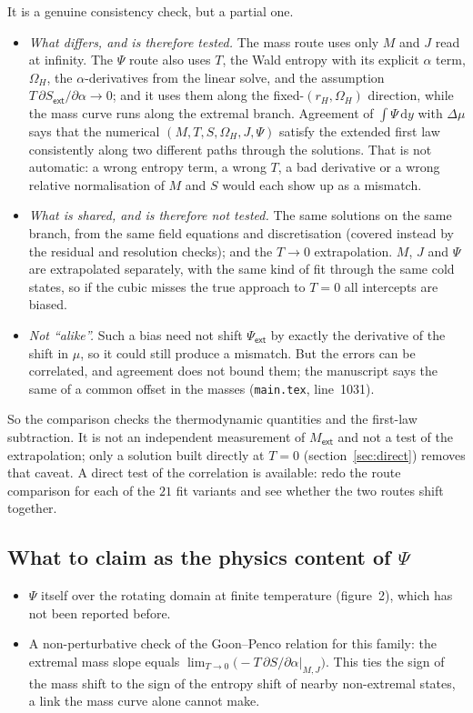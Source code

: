 \documentclass[11pt,a4paper]{article}
\newcommand{\q}[1]{\subsection*{\color{accent}#1}}
\newcommand{\ext}{\mathsf{ext}}
\begin{document}
It is a genuine consistency check, but a partial one.
\begin{itemize}\itemsep3pt
  \item \emph{What differs, and is therefore tested.} The mass route uses only
  $M$ and $J$ read at infinity. The $\Psi$ route also uses $T$, the Wald entropy
  with its explicit $\alpha$ term, $\Omega_H$, the $\alpha$-derivatives from the
  linear solve, and the assumption $T\,\partial S_\ext/\partial\alpha\to0$; and
  it uses them along the fixed-$(r_H,\Omega_H)$ direction, while the mass curve
  runs along the extremal branch. Agreement of $\int\Psi\,\mathrm dy$ with
  $\Delta\mu$ says that the numerical $(M,T,S,\Omega_H,J,\Psi)$ satisfy the
  extended first law consistently along two different paths through the
  solutions. That is not automatic: a wrong entropy term, a wrong $T$, a bad
  derivative or a wrong relative normalisation of $M$ and $S$ would each show
  up as a mismatch.
  \item \emph{What is shared, and is therefore not tested.} The same solutions
  on the same branch, from the same field equations and discretisation
  (covered instead by the residual and resolution checks); and the $T\to0$
  extrapolation. $M$, $J$ and $\Psi$ are extrapolated separately, with the same
  kind of fit through the same cold states, so if the cubic misses the true
  approach to $T=0$ all intercepts are biased.
  \item \emph{Not ``alike''.} Such a bias need not shift $\Psi_\ext$ by exactly
  the derivative of the shift in $\mu$, so it could still produce a mismatch.
  But the errors can be correlated, and agreement does not bound them; the
  manuscript says the same of a common offset in the masses
  (\texttt{main.tex}, line~1031).
\end{itemize}
So the comparison checks the thermodynamic quantities and the first-law
subtraction. It is not an independent measurement of $M_\ext$ and not a test of
the extrapolation; only a solution built directly at $T=0$
(section~\ref{sec:direct}) removes that caveat. A direct test of the
correlation is available: redo the route comparison for each of the $21$ fit
variants and see whether the two routes shift together.

\q{What to claim as the physics content of $\Psi$}

\begin{itemize}\itemsep3pt
  \item $\Psi$ itself over the rotating domain at finite temperature
  (figure~2), which has not been reported before.
  \item A non-perturbative check of the Goon--Penco relation for this family:
  the extremal mass slope equals $\lim_{T\to0}\bigl(-T\,\partial S/\partial
  \alpha|_{M,J}\bigr)$. This ties the sign of the mass shift to the sign of the
  entropy shift of nearby non-extremal states, a link the mass curve alone
  cannot make.
\end{itemize}
\end{document}
